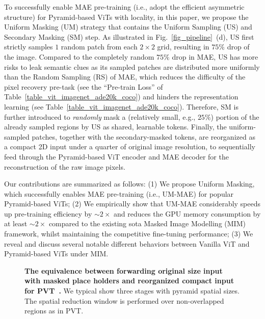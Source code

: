 \documentclass{article}
\begin{document}
To successfully enable MAE pre-training (i.e., adopt the efficient asymmetric structure) for Pyramid-based ViTs with locality, in this paper, we propose the Uniform Masking (UM) strategy that contains the Uniform Sampling (US) and Secondary Masking (SM) step. As illustrated in Fig.~\ref{fig_pipeline}~(d), US first strictly samples $1$ random patch from each $2 \times 2$ grid, resulting in $75\%$ drop of the image. Compared to the completely random $75\%$ drop in MAE, US has more risks to leak semantic clues as its sampled patches are distributed more uniformly than the Random Sampling (RS) of MAE, which reduces the difficulty of the pixel recovery pre-task (see the ``Pre-train Loss'' of  Table~\ref{table_vit_imagenet_ade20k_coco}) and hinders the representation learning (see Table~\ref{table_vit_imagenet_ade20k_coco}). Therefore, SM is further introduced to \emph{randomly} mask a (relatively small, e.g., $25\%$) portion
of the already sampled regions by US as shared, learnable tokens. Finally, the uniform-sampled patches, together with the secondary-masked tokens, are reorganized as a compact 2D input under a quarter of original image resolution, to sequentially feed through the Pyramid-based ViT encoder and MAE decoder for the reconstruction of the 
raw image pixels.

Our contributions are summarized as follows: 
(1) We propose Uniform Masking, which successfully enables MAE pre-training (i.e., UM-MAE) for popular Pyramid-based ViTs; 
(2) We empirically show that UM-MAE considerably speeds up pre-training efficiency by $\sim2\times$ and reduces the GPU memory consumption by at least $\sim2\times$ compared to the existing sota Masked Image Modelling (MIM) framework, whilst maintaining the competitive fine-tuning performance; 
(3) We reveal and discuss several notable different behaviors between Vanilla ViT and Pyramid-based ViTs under MIM.



\begin{figure}[t]
	\vspace{0pt}
	\begin{center}
		\setlength{\fboxrule}{0pt}
	\end{center}	
	\vspace{-9pt}
	\caption{\textbf{The equivalence between forwarding original size input with masked place holders and reorganized compact input for PVT~\cite{wang2021pyramid}.} We typical show three stages with pyramid spatial sizes. The spatial reduction window is performed over non-overlapped regions as in PVT.
	}
	\label{fig_pvt_equivalence}
	\vspace{-12pt}
\end{figure}
\end{document}
